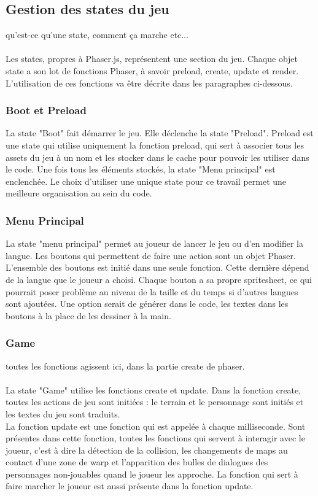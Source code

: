 \documentclass[11pt]{article}
\begin{document}
\subsection{Gestion des states du jeu}
qu'est-ce qu'une state, comment ça marche etc...\\\\
Les states, propres à Phaser.js, représentent une section du jeu. Chaque objet state a son lot de fonctions Phaser, à savoir preload, create, update et render. L'utilisation de ces fonctions va être décrite dans les paragraphes ci-dessous.

\subsubsection{Boot et Preload}
La state "Boot" fait démarrer le jeu. Elle déclenche la state "Preload". Preload est une state qui utilise uniquement la fonction preload, qui sert à associer tous les assets du jeu à un nom et les stocker dans le cache pour pouvoir les utiliser dans le code. Une fois tous les éléments stockés, la state "Menu principal" est enclenchée. Le choix d'utiliser une unique state pour ce travail permet une meilleure organisation au sein du code.
\subsubsection{Menu Principal}
La state "menu principal" permet au joueur de lancer le jeu ou d'en modifier la langue. Les boutons qui permettent de faire une action sont un objet Phaser. L'ensemble des boutons est initié dans une seule fonction. Cette dernière dépend de la langue que le joueur a choisi. Chaque bouton a sa propre spritesheet, ce qui pourrait poser problème au niveau de la taille et du temps si d'autres langues sont ajoutées. Une option serait de générer dans le code, les textes dans les boutons à la place de les dessiner à la main.
\subsubsection{Game}
toutes les fonctions agissent ici, dans la partie create de phaser.
\\\\La state "Game" utilise les fonctions create et update. Dans la fonction create, toutes les actions de jeu sont initiées : le terrain et le personnage sont initiés et les textes du jeu sont traduits.
\\La fonction update est une fonction qui est appelée à chaque milliseconde. Sont présentes dans cette fonction, toutes les fonctions qui servent à interagir avec le joueur, c'est à dire la détection de la collision, les changements de maps au contact d'une zone de warp et l'apparition des bulles de dialogues des personnages non-jouables quand le joueur les approche. La fonction qui sert à faire marcher le joueur est aussi présente dans la fonction update.
\end{document}

